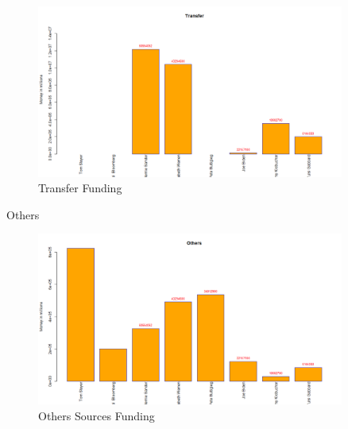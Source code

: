\begin{figure}[H]
    \centering
    \includegraphics[width=0.9\textwidth]{figures/Transfer.png}
    \caption{Transfer Funding}
    \label{Transfer}
\end{figure}
Others
\begin{figure}[H]
    \centering
    \includegraphics[width=0.9\textwidth]{figures/Others.png}
    \caption{Others Sources Funding}
    \label{Others}
\end{figure}